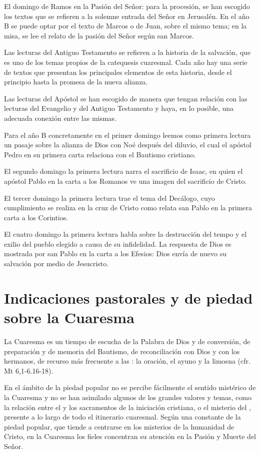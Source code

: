 \begin{introstyle}
El domingo de Ramos en la Pasión del Señor: para la procesión, se han escogido los textos que se refieren a la solemne entrada del Señor en Jerusalén. En el año B se puede optar por el texto de Marcos o de Juan, sobre el mismo tema; en la misa, se lee el relato de la pasión del Señor según san Marcos.

Las lecturas del Antiguo Testamento se refieren a la historia de la salvación, que es uno de los temas propios de la catequesis cuaresmal. Cada año hay una serie de textos que presentan los principales elementos de esta historia, desde el principio hasta la promesa de la nueva alianza. 

Las lecturas del Apóstol se han escogido de manera que tengan relación con las lecturas del Evangelio y del Antiguo Testamento y haya, en lo posible, una adecuada conexión entre las mismas.

Para el año B concretamente en el primer domingo leemos como primera lectura un pasaje sobre la alianza de Dios con Noé después del diluvio, el cual el apóstol Pedro en su primera carta relaciona con el Bautismo cristiano. 

El segundo domingo la primera lectura narra el sacrificio de Isaac, en quien el apóstol Pablo en la carta a los Romanos ve una imagen del sacrificio de Cristo.

El tercer domingo la primera lectura trae el tema del Decálogo, cuyo cumplimiento se realiza en la cruz de Cristo como relata san Pablo en la primera carta a los Corintios.

El cuatro domingo la primera lectura habla sobre la destrucción del tempo y el exilio del pueblo elegido a causa de su infidelidad. La respuesta de Dios es mostrada por san Pablo en la carta a los Efesios: Dios envía de nuevo su salvación por medio de Jesucristo.


\newpage 
\section{Indicaciones pastorales y de piedad sobre la Cuaresma}

La Cuaresma es un tiempo de escucha de la Palabra de Dios y de conversión, de preparación y de memoria del Bautismo, de reconciliación con Dios y con los hermanos, de recurso más frecuente a las : la oración, el ayuno y la limosna (cfr. Mt 6,1-6.16-18).

En el ámbito de la piedad popular no se percibe fácilmente el sentido mistérico de la Cuaresma y no se han asimilado algunos de los grandes valores y temas, como la relación entre el  y los sacramentos de la iniciación cristiana, o el misterio del , presente a lo largo de todo el itinerario cuaresmal. Según una constante de la piedad popular, que tiende a centrarse en los misterios de la humanidad de Cristo, en la Cuaresma los fieles concentran su atención en la Pasión y Muerte del Señor.


\end{introstyle}
